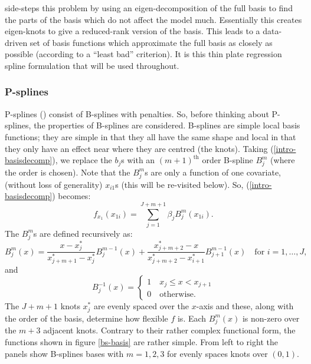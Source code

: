  side-steps this problem by using an eigen-decomposition of the full basis to find the parts of the basis which do not affect the model much. Essentially this creates eigen-knots to give a reduced-rank version of the basis. This leads to a data-driven set of basis functions which approximate the full basis as closely as possible (according to a ``least bad'' criterion). It is this thin plate regression spline formulation that will be used throughout. 

\subsubsection{P-splines}
\label{intro-psplines}

P-splines (\cite{eilersmarx96}) consist of B-splines with penalties. So, before thinking about P-splines, the properties of B-splines are considered. B-splines are simple local basis functions; they are simple in that they all have the same shape and local in that they only have an effect near where they are centred (the knots). Taking (\ref{intro-basisdecomp}), we replace the $b_j$s with an $(m+1)^\text{th}$ order B-spline $B_j^m$ (where the order is chosen). Note that the $B_j^m$s are only a function of one covariate, (without loss of generality) $x_{i1}$s (this will be re-visited below). So, (\ref{intro-basisdecomp}) becomes:
\begin{equation*}
f_{x_1}(x_{1i}) = \sum_{j=1}^{J+m+1} \beta_j B^m_j(x_{1i}).
\end{equation*}
The $B_j^m$s are defined recursively as:
\begin{equation*}
B_j^m(x) = \frac{x-x^*_j}{x^*_{j+m+1} - x^*_j} B_j^{m-1}(x) + \frac{x^*_{j+m+2} -x}{x^*_{j+m+2} - x^*_{i+1}} B_{j+1}^{m-1}(x) \quad \text{for } i=1,\ldots,J,
\end{equation*}
and
\begin{equation*}
 B_j^{-1}(x)=\begin{cases}
1 \quad x_j \leq x < x_{j+1}\\
0 \quad \text{otherwise}. 
\end{cases}
\end{equation*}
The $J+m+1$ knots $x^*_j$ are evenly spaced over the $x$-axis and these, along with the order of the basis, determine how flexible $f$ is. Each $B^m_j(x)$ is non-zero over the $m+3$ adjacent knots. Contrary to their rather complex functional form, the functions shown in figure \ref{bs-basis} are rather simple. From left to right the panels show B-splines bases with $m=1,2,3$ for evenly spaces knots over $(0,1)$.


